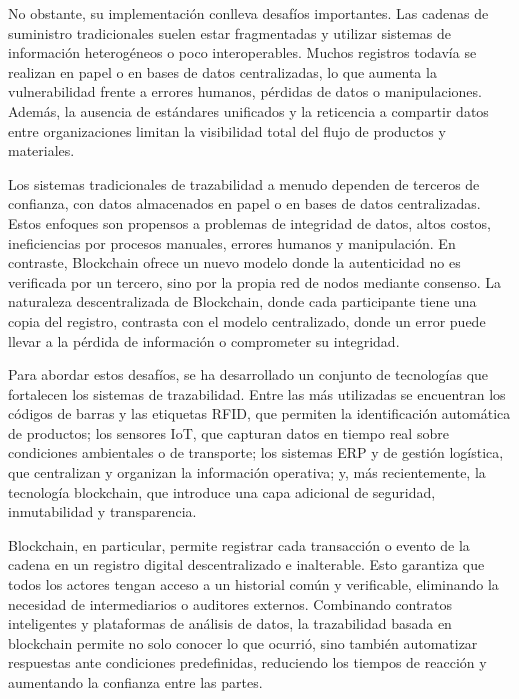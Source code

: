 No obstante, su implementación conlleva desafíos importantes. Las cadenas de suministro tradicionales suelen estar fragmentadas y utilizar sistemas de información heterogéneos o poco interoperables. Muchos registros todavía se realizan en papel o en bases de datos centralizadas, lo que aumenta la vulnerabilidad frente a errores humanos, pérdidas de datos o manipulaciones. Además, la ausencia de estándares unificados y la reticencia a compartir datos entre organizaciones limitan la visibilidad total del flujo de productos y materiales.

Los sistemas tradicionales de trazabilidad a menudo dependen de terceros de confianza, con datos almacenados en papel o en bases de datos centralizadas. Estos enfoques son propensos a problemas de integridad de datos, altos costos, ineficiencias por procesos manuales, errores humanos y manipulación. En contraste, Blockchain ofrece un nuevo modelo donde la autenticidad no es verificada por un tercero, sino por la propia red de nodos mediante consenso. La naturaleza descentralizada de Blockchain, donde cada participante tiene una copia del registro, contrasta con el modelo centralizado, donde un error puede llevar a la pérdida de información o comprometer su integridad.

Para abordar estos desafíos, se ha desarrollado un conjunto de tecnologías que fortalecen los sistemas de trazabilidad. Entre las más utilizadas se encuentran los códigos de barras y las etiquetas RFID, que permiten la identificación automática de productos; los sensores IoT, que capturan datos en tiempo real sobre condiciones ambientales o de transporte; los sistemas ERP y de gestión logística, que centralizan y organizan la información operativa; y, más recientemente, la tecnología blockchain, que introduce una capa adicional de seguridad, inmutabilidad y transparencia.

Blockchain, en particular, permite registrar cada transacción o evento de la cadena en un registro digital descentralizado e inalterable. Esto garantiza que todos los actores tengan acceso a un historial común y verificable, eliminando la necesidad de intermediarios o auditores externos. Combinando contratos inteligentes y plataformas de análisis de datos, la trazabilidad basada en blockchain permite no solo conocer lo que ocurrió, sino también automatizar respuestas ante condiciones predefinidas, reduciendo los tiempos de reacción y aumentando la confianza entre las partes.

